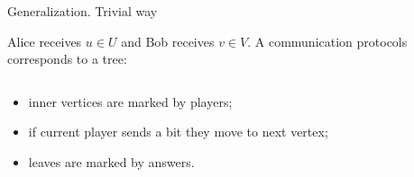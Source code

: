 \begin{frame}{Generalization. Trivial way}

    Alice receives $u \in U$ and Bob receives $v \in V$. A communication protocols corresponds to a tree:

    \begin{columns}[t]
		\begin{column}{0.7\textwidth}
            \begin{itemize}
                \item<2-> inner vertices are marked by players;
	            \item<3-> if current player sends a bit they move to next vertex;
    		    \item<8-> leaves are marked by answers.
	        \end{itemize}



        \end{column}
        
		\begin{column}{0.25\textwidth}
            
		\end{column}
	\end{columns}

\end{frame}

